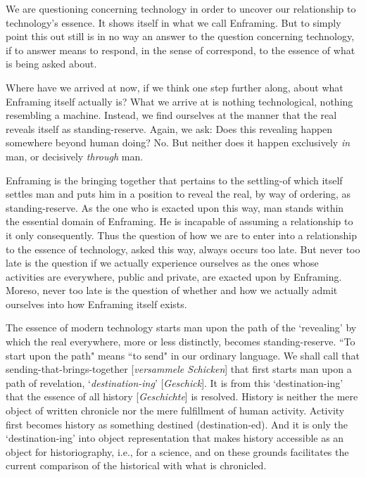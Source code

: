 \documentclass[paper=a4, fontsize=11pt,twoside]{scrartcl}
\begin{document}
\vspace{10mm}

We are questioning concerning technology in order to uncover our relationship to technology's essence. It shows itself in what we call Enframing. But to simply point this out still is in no way an answer to the question concerning technology, if to answer means to respond, in the sense of correspond, to the essence of what is being asked about.

Where have we arrived at now, if we think one step further along, about what Enframing itself actually is? What we arrive at is nothing technological, nothing resembling a machine. Instead, we find ourselves at the manner that the real reveals itself as standing-reserve. Again, we ask: Does this revealing happen somewhere beyond human doing? No. But neither does it happen exclusively \textit{in} man, or decisively \textit{through} man.

Enframing is the bringing together that pertains to the settling-of which itself settles man and puts him in a position to reveal the real, by way of ordering, as standing-reserve. As the one who is exacted upon this way, man stands within the essential domain of Enframing. He is incapable of assuming a relationship to it only consequently. Thus the question of how we are to enter into a relationship to the essence of technology, asked this way, always occurs too late. But never too late is the question if we actually experience ourselves as the ones whose activities are everywhere, public and private, are exacted upon by Enframing. Moreso, never too late is the question of whether and how we actually admit ourselves into how Enframing itself exists.

The essence of modern technology starts man upon the path of the `revealing' by which the real everywhere, more or less distinctly, becomes standing-reserve. ``To start upon the path" means ``to send" in our ordinary language. We shall call that sending-that-brings-together [\textit{versammele Schicken}] that first starts man upon a path of revelation, `\textit{destination-ing}' [\textit{Geschick}]. It is from this `destination-ing' that the essence of all history [\textit{Geschichte}] is resolved. History is neither the mere object of written chronicle nor the mere fulfillment of human activity. Activity first becomes history as something destined (destination-ed). And it is only the `destination-ing' into object representation that makes history accessible as an object for historiography, i.e., for a science, and on these grounds facilitates the current comparison of the historical with what is chronicled.
\end{document}
